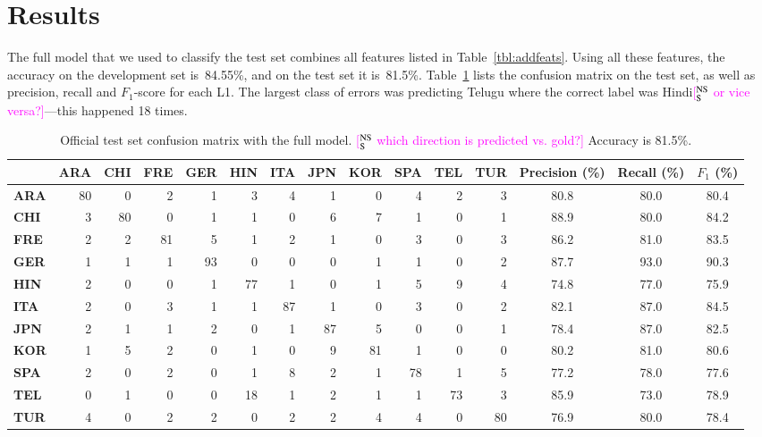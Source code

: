 \documentclass[11pt,letterpaper]{article}
\newcommand{\ensuretext}[1]{#1}
\newcommand{\nssmarker}{\ensuretext{\textcolor{magenta}{\ensuremath{^{\textsc{NS}}_{\textsc{S}}}}}}
\newcommand{\arkcomment}[3]{\ensuretext{\textcolor{#3}{[#1 #2]}}}
\newcommand{\nss}[1]{\arkcomment{\nssmarker}{#1}{magenta}}
\newcommand{\Tref}[1]{Table~\ref{#1}}
\begin{document}
\section{Results}
\label{sec:results}
The full model that we used to classify the test set combines all
features listed in \Tref{tbl:addfeats}. Using all these features, the
accuracy on the development set is~84.55\%, and on the test set it
is~81.5\%. \Tref{tbl:matrix} lists the confusion matrix on the test
set, as well as precision, recall and $F_1$-score for each L1.
The largest class of errors was predicting Telugu where the correct label 
was Hindi\nss{or vice versa?}---this happened 18 times. 



\begin{table*}[hbt]
\small\centering
\begin{tabular}{>{\bf}l|r@{ }r@{ }r@{ }r@{ }r@{ }r@{ }r@{ }r@{ }r@{ }r@{ }r|ccc} %
	& \bf ARA & \bf CHI & \bf FRE & \bf GER & \bf HIN & \bf ITA & \bf JPN & \bf KOR & \bf SPA & \bf TEL & \bf TUR & \bf Precision (\%) & \bf Recall (\%) & \bf $F_1$ (\%) \\
\hline
ARA & 80 & 0 & 2 & 1 & 3 & 4 & 1 & 0 & 4 & 2 & 3 & 80.8 & 80.0 & 80.4 \\
CHI & 3 & 80 & 0 & 1 & 1 & 0 & 6 & 7 & 1 & 0 & 1 & 88.9 & 80.0 & 84.2 \\
FRE & 2 & 2 & 81 & 5 & 1 & 2 & 1 & 0 & 3 & 0 & 3 & 86.2 & 81.0 & 83.5 \\
\hline
GER & 1 & 1 & 1 & 93 & 0 & 0 & 0 & 1 & 1 & 0 & 2 & 87.7 & 93.0 & 90.3 \\
HIN & 2 & 0 & 0 & 1 & 77 & 1 & 0 & 1 & 5 & 9 & 4 & 74.8 & 77.0 & 75.9 \\
ITA & 2 & 0 & 3 & 1 & 1 & 87 & 1 & 0 & 3 & 0 & 2 & 82.1 & 87.0 & 84.5 \\
\hline
JPN & 2 & 1 & 1 & 2 & 0 & 1 & 87 & 5 & 0 & 0 & 1 & 78.4 & 87.0 & 82.5 \\
KOR & 1 & 5 & 2 & 0 & 1 & 0 & 9 & 81 & 1 & 0 & 0 & 80.2 & 81.0 & 80.6 \\
SPA & 2 & 0 & 2 & 0 & 1 & 8 & 2 & 1 & 78 & 1 & 5 & 77.2 & 78.0 & 77.6 \\
\hline
TEL & 0 & 1 & 0 & 0 & 18 & 1 & 2 & 1 & 1 & 73 & 3 & 85.9 & 73.0 & 78.9 \\
TUR & 4 & 0 & 2 & 2 & 0 & 2 & 2 & 4 & 4 & 0 & 80 & 76.9 & 80.0 & 78.4 \\
\end{tabular}
\caption{Official test set confusion matrix with the full model. \nss{which direction is predicted vs. gold?}
Accuracy is 81.5\%.}
\label{tbl:matrix}
\end{table*}
\end{document}
